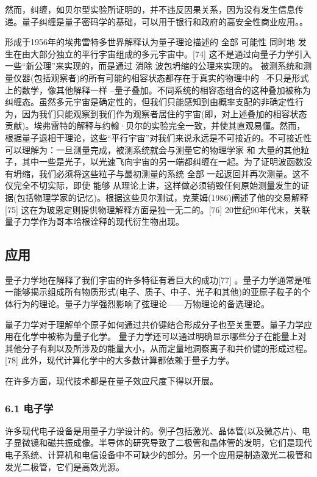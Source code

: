 然而，纠缠，如贝尔型实验所证明的，并不违反因果关系，因为没有发生信息传递。量子纠缠是量子密码学的基础，可以用于银行和政府的高安全性商业应用。。

形成于1956年的埃弗雷特多世界解释认为量子理论描述的 全部 可能性 同时地 发生在由大部分独立的平行宇宙组成的多元宇宙中。[74] 这不是通过向量子力学引入一些“新公理”来实现的，而是通过 消除 波包坍缩的公理来实现的。 被测系统和测量仪器(包括观察者)的所有可能的相容状态都存在于真实的物理中的 –不只是形式上的数学，像其他解释一样 –量子叠加。不同系统的相容态组合的这种叠加被称为纠缠态。虽然多元宇宙是确定性的，但我们只能感知到由概率支配的非确定性行为，因为我们只能观察到我们作为观察者居住的宇宙(即，对上述叠加的相容状态贡献)。埃弗雷特的解释与约翰·贝尔的实验完全一致，并使其直观易懂。然而，根据量子退相干理论，这些“平行宇宙”对我们来说永远是不可接近的。不可接近性可以理解为：一旦测量完成，被测系统就会与测量它的物理学家 和 大量的其他粒子，其中一些是光子，以光速飞向宇宙的另一端都纠缠在一起。为了证明波函数没有坍缩，我们必须将这些粒子与最初测量的系统 全部 一起返回并再次测量。这不仅完全不切实际，即使 能够 从理论上讲，这样做必须销毁任何原始测量发生的证据(包括物理学家的记忆)。根据这些贝尔测试，克莱姆(1986)阐述了他的交易解释[75] 这在为玻恩定则提供物理解释方面是独一无二的。[76] 20世纪90年代末，关联量子力学作为哥本哈根诠释的现代衍生物出现。

\subsection{应用}
量子力学地在解释了我们宇宙的许多特征有着巨大的成功[77] 。量子力学通常是唯一能够揭示组成所有物质形式(电子、质子、中子、光子和其他)的亚原子粒子的个体行为的理论。量子力学强烈影响了弦理论——万物理论的备选理论。

量子力学对于理解单个原子如何通过共价键结合形成分子也至关重要。量子力学应用在化学中被称为量子化学。 量子力学还可以通过明确显示哪些分子在能量上对其他分子有利以及所涉及的能量大小，从而定量地洞察离子和共价键的形成过程。[78] 此外，现代计算化学中的大多数计算都依赖于量子力学。

在许多方面，现代技术都是在量子效应尺度下得以开展。

\subsubsection{6.1 电子学}
许多现代电子设备是用量子力学设计的。例子包括激光、晶体管(以及微芯片)、电子显微镜和磁共振成像。半导体的研究导致了二极管和晶体管的发明，它们是现代电子系统、计算机和电信设备中不可缺少的部分。另一个应用是制造激光二极管和发光二极管，它们是高效光源。

